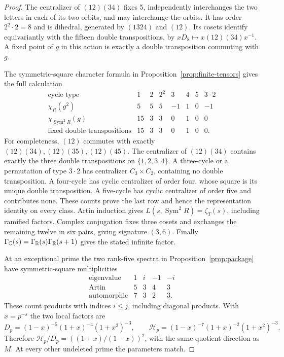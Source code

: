 \begin{proof}
The centralizer of $(12)(34)$ fixes 5, independently interchanges the two letters in each of its two orbits, and may interchange the orbits. It has order $2^2\cdot2=8$ and is dihedral, generated by $(1324)$ and $(12)$. Its cosets identify equivariantly with the fifteen double transpositions, by $xD_8\mapsto x(12)(34)x^{-1}$. A fixed point of $g$ in this action is exactly a double transposition commuting with $g$.

The symmetric-square character formula in Proposition~\ref{prop:finite-tensors} gives the full calculation
\[
\begin{array}{c|rrrrrrr}
\text{cycle type}&1&2&2^2&3&4&5&3\cdot2\\ \hline
\chi_R(g^2)&5&5&5&-1&1&0&-1\\
\chi_{\operatorname{Sym}^2R}(g)&15&3&3&0&1&0&0\\
\text{fixed double transpositions}&15&3&3&0&1&0&0.
\end{array}
\]
For completeness, $(12)$ commutes with exactly $(12)(34),(12)(35),(12)(45)$. The centralizer of $(12)(34)$ contains exactly the three double transpositions on $\{1,2,3,4\}$. A three-cycle or a permutation of type $3\cdot2$ has centralizer $C_3\times C_2$, containing no double transposition. A four-cycle has cyclic centralizer of order four, whose square is its unique double transposition. A five-cycle has cyclic centralizer of order five and contributes none. These counts prove the last row and hence the representation identity on every class. Artin induction gives $L(s,\operatorname{Sym}^2R)=\zeta_T(s)$, including ramified factors. Complex conjugation fixes three cosets and exchanges the remaining twelve in six pairs, giving signature $(3,6)$. Finally $\Gamma_{\mathbb C}(s)=\Gamma_{\mathbb R}(s)\Gamma_{\mathbb R}(s+1)$ gives the stated infinite factor.

At an exceptional prime the two rank-five spectra in Proposition~\ref{prop:package} have symmetric-square multiplicities
\[
\begin{array}{c|rrrr}
\text{eigenvalue}&1&i&-1&-i\\ \hline
\text{Artin}&5&3&4&3\\
\text{automorphic}&7&3&2&3 .
\end{array}
\]
These count products with indices $i\leq j$, including diagonal products. With $x=p^{-s}$ the two local factors are
\[
D_p=(1-x)^{-5}(1+x)^{-4}(1+x^2)^{-3},\qquad
\mathcal H_p=(1-x)^{-7}(1+x)^{-2}(1+x^2)^{-3}.
\]
Therefore $\mathcal H_p/D_p=((1+x)/(1-x))^2$, with the same quotient direction as $M$. At every other undeleted prime the parameters match.


\end{proof}
